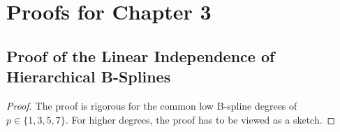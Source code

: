 \section{Proofs for Chapter 3}

\printornamentsfalse
\subsection{Proof of the Linear Independence of Hierarchical B-Splines}
\label{sec:proofHierBSplineLinearlyIndependent}
\printornamentstrue

\propHierBSplineLinearlyIndependent*

\begin{proof}
  The proof is rigorous for the common low B-spline degrees of
  $p \in \{1, 3, 5, 7\}$.
  For higher degrees, the proof has to be viewed as a sketch.
  

\end{proof}
